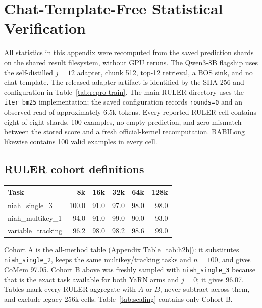 \section{Chat-Template-Free Statistical Verification}
\label{app:statistics}

All statistics in this appendix were recomputed from the saved prediction
shards on the shared result filesystem, without GPU reruns. The Qwen3-8B
flagship uses the self-distilled $j{=}12$ adapter, chunk 512, top-12 retrieval,
a BOS sink, and no chat template. The released adapter artifact is identified by the SHA-256 and configuration in
Table~\ref{tab:repro-train}. The main RULER directory uses the
\texttt{iter\_bm25} implementation; the saved configuration records
\texttt{rounds=0} and an observed read of approximately 6.5k tokens. Every reported RULER cell contains eight of eight shards, 100
examples, no empty prediction, and zero mismatch between the stored score and a
fresh official-kernel recomputation. BABILong likewise contains 100 valid
examples in every cell.

\subsection{RULER cohort definitions}
\begin{center}
\captionsetup{hypcap=false}
\centering
\small
\setlength{\tabcolsep}{4pt}
\begin{tabular}{@{}lrrrrr@{}}
\toprule
\textbf{Task} & \textbf{8k} & \textbf{16k} & \textbf{32k} & \textbf{64k} & \textbf{128k} \\
\midrule
niah\_single\_3 & 100.0 & 91.0 & 97.0 & 98.0 & 98.0 \\
niah\_multikey\_1 & 94.0 & 91.0 & 99.0 & 90.0 & 93.0 \\
variable\_tracking & 96.2 & 98.0 & 98.2 & 98.6 & 99.0 \\
\bottomrule
\end{tabular}
\label{tab:ruler-statistics}
\end{center}

Cohort A is the all-method table (Appendix Table~\ref{tab:h2h}): it substitutes
\texttt{niah\_single\_2}, keeps the same multikey/tracking tasks and $n{=}100$,
and gives CoMem 97.05. Cohort B above was freshly sampled with
\texttt{niah\_single\_3} because that is the exact task available for both YaRN
arms and $j{=}0$; it gives 96.07. Tables mark every RULER aggregate with $A$ or
$B$, never subtract across them, and exclude legacy 256k cells. Table~\ref{tab:scaling}
contains only Cohort B.

